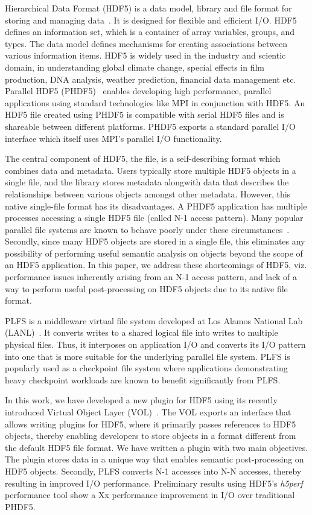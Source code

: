 Hierarchical Data Format (HDF5) is a data model, library and file format for storing and managing data~\cite{hdf5_ad11}. It is designed for flexible and efficient I/O. HDF5 defines an information set, which is a container of array variables, groups, and types. The data model defines mechanisms for creating associations between various information items. HDF5 is widely used in the industry and scientic domain, in understanding global climate change, special effects in film production, DNA analysis, weather prediction, financial data management etc.~\cite{hdf5_users}
Parallel HDF5 (PHDF5)~\cite{phdf5} enables developing high performance, parallel applications using standard technologies like MPI in conjunction with HDF5. An HDF5 file created using PHDF5 is compatible with serial HDF5 files and is shareable between different platforms. PHDF5 exports a standard parallel I/O interface which itself uses MPI's parallel I/O functionality. 

The central component of HDF5, the file, is a self-describing format which combines data and metadata. Users typically store multiple HDF5 objects in a single file, and the library stores metadata alongwith data that describes the relationships between various objects amongst other metadata. 
However, this native single-file format has its disadvantages. A PHDF5 application has multiple processes accessing a single HDF5 file (called N-1 access pattern). Many popular parallel file systems are known to behave poorly under these circumstances~\cite{lustre_perf}\cite{nersc_io}. Secondly, since many HDF5 objects are stored in a single file, this eliminates any possibility of performing useful semantic analysis on objects beyond the scope of an HDF5 application. In this paper, we address these shortcomings of HDF5, viz. performance issues inherently arising from an N-1 access pattern, and lack of a way to perform useful post-processing on HDF5 objects due to its native file format. 

PLFS is a middleware virtual file system developed at Los Alamos National Lab (LANL)~\cite{plfs_sc09}. It converts writes to a shared logical file into writes to multiple physical files.  
Thus, it interposes on application I/O and converts its I/O pattern into one that is more suitable for the underlying parallel file system.
PLFS is popularly used as a checkpoint file system where applications demonstrating heavy checkpoint workloads are known to benefit significantly from PLFS.

In this work, we have developed a new plugin for HDF5 using its recently introduced Virtual Object Layer (VOL)~\cite{vol}. The VOL exports an interface that allows writing plugins for HDF5, where it primarily passes references to HDF5 objects, thereby enabling developers to store objects in a format different from the default HDF5 file format. 
We have written a plugin with two main objectives. The plugin stores data in a unique way that enables semantic post-processing on HDF5 objects. Secondly, PLFS converts N-1 accesses into N-N accesses, thereby resulting in improved I/O performance. Preliminary results using HDF5's \textit{h5perf} performance tool show a Xx performance improvement in I/O over traditional PHDF5.

